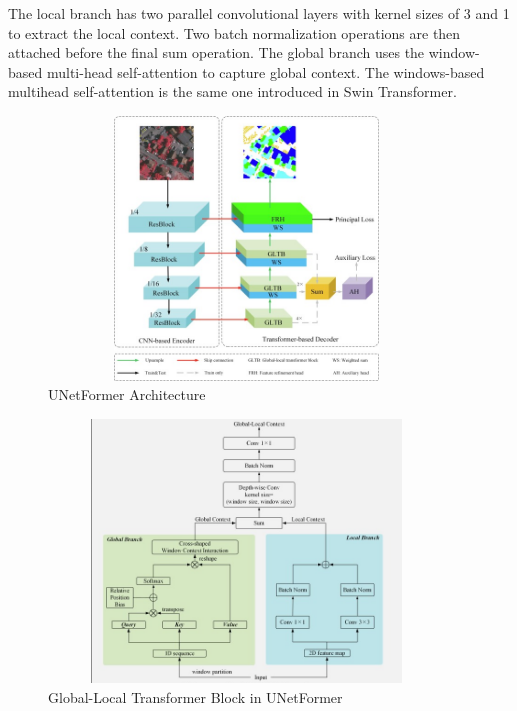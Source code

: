 The local branch has two parallel convolutional layers with kernel sizes of 3 and 1 to extract the local context. Two batch normalization operations are then attached before the final sum operation. The global branch uses the window-based multi-head self-attention to capture global context. The windows-based multihead self-attention is the same one introduced in Swin Transformer.

\FloatBarrier
\begin{figure}[ht]
\includegraphics[width=10.5cm, height=7cm]{images/unetformer.jpg}
\centering
\caption{UNetFormer Architecture}
\label{fig:unetformer}
\end{figure}

\begin{figure}[ht]
\includegraphics[width=10.5cm, height=7cm]{images/gltb.png}
\centering
\caption{Global-Local Transformer Block in UNetFormer}
\label{fig:gltb}
\end{figure}
\FloatBarrier

